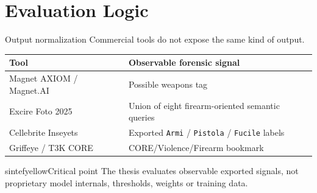 \documentclass{beamer}
\begin{document}
\section{Evaluation Logic}

\begin{frame}{Output normalization}
Commercial tools do not expose the same kind of output.

\begin{table}
\centering
\scriptsize
\begin{tabular}{@{}ll@{}}
\toprule
\textbf{Tool} & \textbf{Observable forensic signal} \\
\midrule
Magnet AXIOM / Magnet.AI & Possible weapons tag \\
Excire Foto 2025 & Union of eight firearm-oriented semantic queries \\
Cellebrite Inseyets & Exported \texttt{Armi} / \texttt{Pistola} / \texttt{Fucile} labels \\
Griffeye / T3K CORE & CORE/Violence/Firearm bookmark \\
\bottomrule
\end{tabular}
\end{table}

\begin{colorblock}[black]{sintefyellow}{Critical point}
The thesis evaluates observable exported signals, not proprietary model internals, thresholds, weights or training data.
\end{colorblock}
\end{frame}
\end{document}
